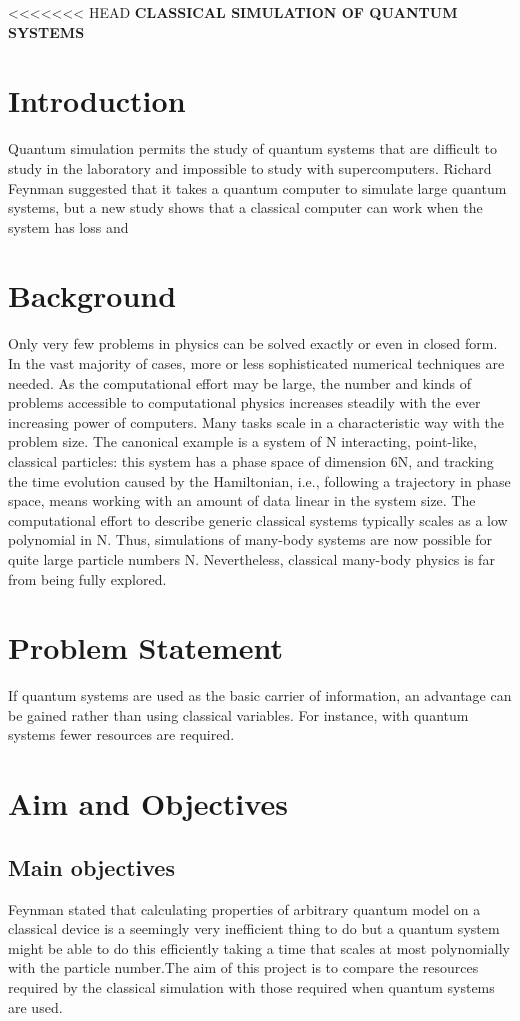 \documentclass[options]{article}
\begin{document}
<<<<<<< HEAD
\textbf{CLASSICAL SIMULATION OF QUANTUM SYSTEMS}

\section{\textbf{ Introduction}}
Quantum simulation permits the study of quantum systems that are difficult to study in the laboratory and impossible to study with supercomputers.
Richard Feynman suggested that it takes a quantum computer to simulate large quantum systems, but a new study shows that a classical computer can work when the system has loss and 


\section{\textbf{ Background }}
Only very few problems in physics can be solved exactly or even in closed form. In the vast majority of cases, more or less sophisticated numerical techniques are needed. As the computational effort may be large, the number and kinds of problems accessible to computational physics increases steadily with the ever increasing power of computers. Many tasks scale in a characteristic way with the problem size. The canonical example is a system of N interacting, point-like, classical particles: this system has a phase space of dimension 6N, and tracking the time evolution caused by the Hamiltonian, i.e., following a trajectory in phase space, means working with an amount of data linear in the system size. The computational effort to describe generic classical systems typically scales as a low polynomial in N. Thus, simulations of many-body systems are now possible for quite large particle numbers N. Nevertheless, classical many-body physics is far from being fully explored.

\section{\textbf{ Problem Statement}}
If quantum systems are used as the basic carrier of information, an advantage can be gained rather than using classical variables. For instance, with quantum systems fewer resources are required.

\section{\textbf{ Aim and Objectives}}

\subsection{Main objectives}
Feynman stated that calculating properties of arbitrary quantum model on a classical device is a seemingly very inefficient thing to do but a quantum system might be able to do this efficiently taking a time that scales at most polynomially with the particle number.The aim of this project is to compare the resources required by the classical simulation with those required when quantum systems are used.
\end{document}

